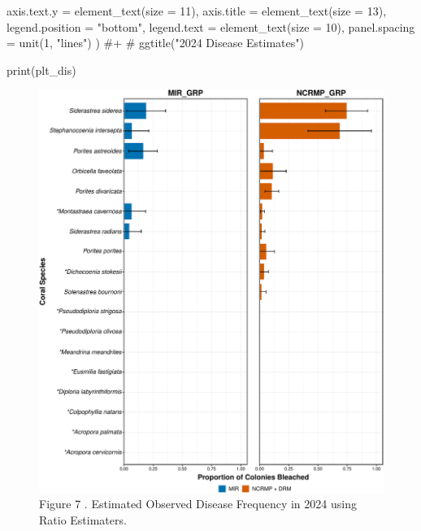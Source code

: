 \documentclass[
]{article}
\newenvironment{Shaded}{\begin{snugshade}}{\end{snugshade}}
\newcommand{\AttributeTok}[1]{\textcolor[rgb]{0.40,0.45,0.13}{#1}}
\newcommand{\CommentTok}[1]{\textcolor[rgb]{0.37,0.37,0.37}{#1}}
\newcommand{\DecValTok}[1]{\textcolor[rgb]{0.68,0.00,0.00}{#1}}
\newcommand{\FunctionTok}[1]{\textcolor[rgb]{0.28,0.35,0.67}{#1}}
\newcommand{\NormalTok}[1]{\textcolor[rgb]{0.00,0.23,0.31}{#1}}
\newcommand{\StringTok}[1]{\textcolor[rgb]{0.13,0.47,0.30}{#1}}
\begin{document}
\begin{Shaded}
\begin{Highlighting}[]
          \AttributeTok{axis.text.y =} \FunctionTok{element\_text}\NormalTok{(}\AttributeTok{size =} \DecValTok{11}\NormalTok{),}
          \AttributeTok{axis.title =} \FunctionTok{element\_text}\NormalTok{(}\AttributeTok{size =} \DecValTok{13}\NormalTok{),}
          \AttributeTok{legend.position =} \StringTok{"bottom"}\NormalTok{,}
          \AttributeTok{legend.text =} \FunctionTok{element\_text}\NormalTok{(}\AttributeTok{size =} \DecValTok{10}\NormalTok{),}
          \AttributeTok{panel.spacing =} \FunctionTok{unit}\NormalTok{(}\DecValTok{1}\NormalTok{, }\StringTok{"lines"}\NormalTok{)}
\NormalTok{        ) }\CommentTok{\#+}
 \CommentTok{\# ggtitle("2024 Disease Estimates")}


\FunctionTok{print}\NormalTok{(plt\_dis)}
\end{Highlighting}
\end{Shaded}

\begin{figure}[H]

{\centering \includegraphics{MIR_quarto_files/figure-pdf/unnamed-chunk-1-1.pdf}

}

\caption{Figure 7 . Estimated Observed Disease Frequency in 2024 using
Ratio Estimaters.}

\end{figure}
\end{document}
